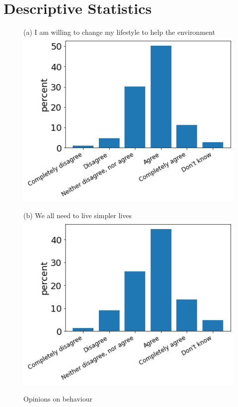 \documentclass[12pt]{article}
\begin{document}
\section{Descriptive Statistics}

\begin{figure}[h!!]
	\centering	
	\caption{Opinions on behaviour}\label{fig:opinions}	
	\begin{minipage}[h!!]{0.32\textwidth}  
		\centering\footnotesize{(a) I am willing to change my lifestyle to help the environment}
		\includegraphics[width=1\textwidth]{../codding_data/results/liss/qk20a175title0.png}
	\end{minipage}
	\begin{minipage}[h!!]{0.32\textwidth}
		\centering\footnotesize{(b) We all need to live simpler lives}
		\includegraphics[width=1\textwidth]{../codding_data/results/liss/qk20a181title0.png}

\end{minipage}
\end{figure}
\end{document}
